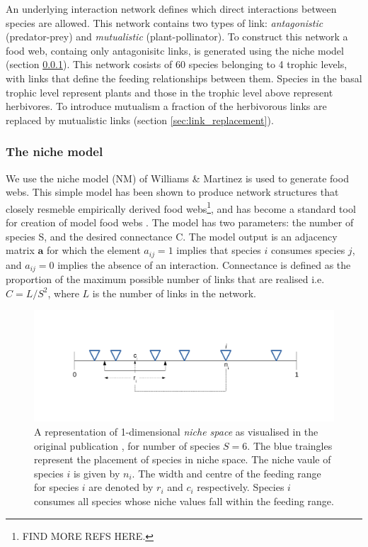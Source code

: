 An underlying interaction network defines which direct interactions between species are allowed. This network contains two types of link: \emph{antagonistic} (predator-prey) and \emph{mutualistic} (plant-pollinator). To construct this network a food web, containg only antagonisitc links, is generated using the niche model (section \ref{sec:niche_model}). This network cosists of 60 species belonging to 4 trophic levels, with links that define the feeding relationships between them. Species in the basal trophic level represent plants and those in the trophic level above represent herbivores. To introduce mutualism a fraction of the herbivorous links are replaced by mutualistic links (section \ref{sec:link_replacement}). 


\subsubsection{The niche model}
\label{sec:niche_model}


We use the niche model (NM) of Williams \& Martinez \cite{williams2000simple} is used to generate food webs. This simple model has been shown to produce network structures that closely resmeble empirically derived food webs\footnote{FIND MORE REFS HERE.}, and has become a standard tool for creation of model food webs \cite{williams2000simple, dunne2002food, stouffer2005quantitative}. The model has two parameters: the number of species S, and the desired connectance C. The model output is an adjacency matrix $\mathbf{a}$ for which the element $a_{ij} = 1$ implies that species $i$ consumes species $j$, and $a_{ij} = 0$ implies the absence of an interaction. Connectance is defined as the proportion of the maximum possible number of links that are realised i.e. $C = L/S^2$, where $L$ is the number of links in the network.

\begin{figure}
	\centering
	\includegraphics[width=\textwidth]{"diagrams/niche_model"}
	\caption{A representation of 1-dimensional \emph{niche space} as visualised in the original publication \cite{williams2000simple}, for number of species $S=6$. The blue traingles represent the placement of species in niche space. The niche vaule of species $i$ is given by $n_i$. The width and centre of the feeding range for species $i$ are denoted by $r_i$ and $c_i$ respectively. Species $i$ consumes all species whose niche values fall within the feeding range.}
	\label{fig:niche_model}
\end{figure}


